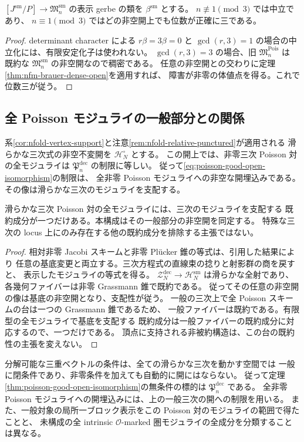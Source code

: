 \begin{corollary}
\label{cor:poisson-enlarged-brauer}
$[J^{\mathrm{sm}}/P]\to\mathfrak M_n^{\mathrm{sm}}$ の表示 gerbe の類を
$\beta^{\mathrm{sm}}$ とする。
$n\not\equiv1\pmod3$ では中立であり、
$n\equiv1\pmod3$ ではどの非空開上でも位数が正確に三である。
\end{corollary}
\begin{proof}
determinant character による $r\beta=3\beta=0$ と
$\gcd(r,3)=1$ の場合の中立化には、有限安定化子は使われない。
$\gcd(r,3)=3$ の場合、旧 $\mathfrak M_n^{\mathrm{Pois}}$ は
既約な $\mathfrak M_n^{\mathrm{sm}}$ の非空開なので稠密である。
任意の非空開との交わりに定理\ref{thm:nfm-brauer-dense-open}を適用すれば、
障害が非零の体値点を得る。これで位数三が従う。
\end{proof}

\subsection{全 Poisson モジュライの一般部分との関係}

\begin{corollary}[一般三次上の開埋込みと支配的成分]
\label{cor:poisson-generic-open-immersion}
系\ref{cor:nfold-vertex-support}と注意\ref{rem:nfold-relative-punctured}が適用される
滑らかな三次式の非空不変開を $\mathcal H_N^\circ$ とする。
この開上では、非零三次 Poisson 対の全モジュライは
$\mathfrak P_n^{\mathrm{dec}}$ の制限に等しい。
従って\eqref{eq:poisson-good-open-isomorphism}の制限は、
全非零 Poisson モジュライへの非空な開埋込みである。
その像は滑らかな三次のモジュライを支配する。

滑らかな三次 Poisson 対の全モジュライには、三次のモジュライを支配する
既約成分が一つだけある。本構成はその一般部分の非空開を同定する。
特殊な三次の locus 上にのみ存在する他の既約成分を排除する主張ではない。
\end{corollary}
\begin{proof}
相対非零 Jacobi スキームと非零 Pl\"ucker 錐の等式は、引用した結果により
任意の基底変更と両立する。三次方程式の直線束の捻りと射影群の商を戻すと、
表示したモジュライの等式を得る。
$\mathcal Z_N^{\mathrm{dec}}\to\mathcal H_N^{\mathrm{sm}}$ は滑らかな全射であり、
各幾何ファイバーは非零 Grassmann 錐で既約である。
従ってその任意の非空開の像は基底の非空開となり、支配性が従う。
一般の三次上で全 Poisson スキームの台は一つの Grassmann 錐であるため、
一般ファイバーは既約である。有限型の全モジュライで基底を支配する
既約成分は一般ファイバーの既約成分に対応するので、一つだけである。
頂点に支持される非被約構造は、この台の既約性の主張を変えない。
\end{proof}

\begin{remark}[開埋込みの範囲]
分解可能な三重ベクトルの条件は、全ての滑らかな三次を動かす空間では
一般に閉条件であり、非零条件を加えても自動的に開にはならない。
従って定理\ref{thm:poisson-good-open-isomorphism}の無条件の標的は
$\mathfrak P_n^{\mathrm{dec}}$ である。
全非零 Poisson モジュライへの開埋込みには、上の一般三次の開への制限を用いる。
また、一般対象の局所一ブロック表示をこの Poisson 対のモジュライの範囲で得たことと、
未構成の全 intrinsic $\mathcal O$-marked 圏モジュライの全成分を分類することは異なる。
\end{remark}
